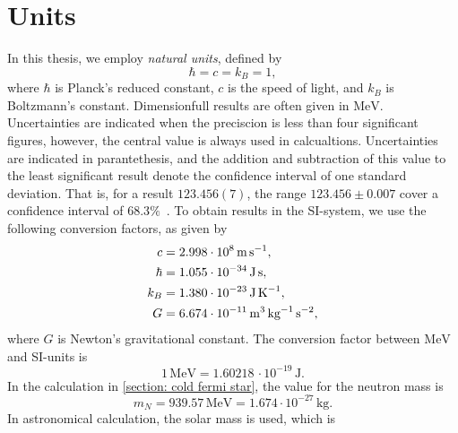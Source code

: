 \section{Units}
\label{section: units}

In this thesis, we employ \emph{natural units}, defined by
%
\begin{equation}
    \hbar = c = k_B = 1,
\end{equation}
%
where $\hbar$ is Planck's reduced constant, $c$ is the speed of light, and $k_B$ is Boltzmann's constant.
Dimensionfull results are often given in $\text{MeV}$.
Uncertainties are indicated when the preciscion is less than four significant figures, however, the central value is always used in calcualtions.
Uncertainties are indicated in parantethesis, and the addition and subtraction of this value to the least significant result denote the confidence interval of one standard deviation.
That is, for a result $123.456(7)$, the range $123.456\pm0.007$ cover a confidence interval of $68.3\%$~\autocite{particledatagroupReviewParticlePhysics2020}.
To obtain results in the SI-system, we use the following conversion factors, as given by~\cite{particledatagroupReviewParticlePhysics2020}
%
\begin{align}
    \label{speed of ligh}
    c       &= 2.998 \cdot 10^8     \, \text{m} \, \text{s}^{-1}, \\
    \label{hbar}
    \hbar   &= 1.055 \cdot 10^{-34} \, \text{J} \, \text{s}, \\
    \label{Boltzmanns constat}
    k_B     &= 1.380 \cdot 10^{-23} \, \text{J} \, \text K^{-1}, \\
    \label{Newtons gravitational constant}
    G       &= 6.674 \cdot 10^{-11} \, \text m^3 \, \text{kg}^{-1} \, \text s^{-2},
\end{align}
%
where $G$ is Newton's gravitational constant.
The conversion factor between $\text{MeV}$ and SI-units is
%
\begin{equation}
    \label{electronvolt}
    1 \, \text{MeV} = 1.60218\, \cdot 10^{-19} \, \text{J}. 
\end{equation}
%
In the calculation in \autoref{section: cold fermi star}, the value for the neutron mass is~\autocite{particledatagroupReviewParticlePhysics2020}
%
\begin{equation}
    \label{mass of neutron}
    m_N = 939.57 \, \text{MeV} = 1.674\cdot 10^{-27} \, \text{kg}.
\end{equation}
%
In astronomical calculation, the solar mass is used, which is~\autocite{particledatagroupReviewParticlePhysics2020}
